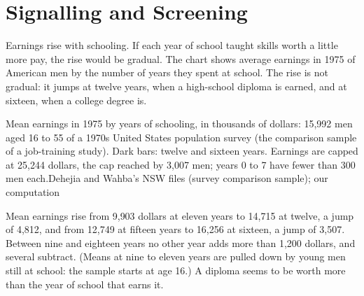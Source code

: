 \chapter{Signalling and Screening}\label{ch:b2:signalling-and-screening}

Earnings rise with schooling. If each year of school taught skills worth a little more pay, the rise would be gradual.
The chart shows average earnings in 1975 of American men by the number of years they spent at school. The rise is
not gradual: it jumps at twelve years, when a high-school diploma is earned, and at sixteen, when a college degree is.

\begin{openingchart}{Mean earnings in 1975 by years of schooling, in thousands of dollars: 15{,}992 men aged 16 to 55 of
  a 1970s United States population survey (the comparison sample of a job-training study). Dark bars: twelve and
  sixteen years. Earnings are capped at 25{,}244 dollars, the cap reached by 3{,}007 men; years 0 to 7 have fewer than
  300 men each.}{Dehejia and Wahba's NSW files (survey comparison sample); our computation}
\end{openingchart}

Mean earnings rise from 9{,}903 dollars at eleven years to 14{,}715 at twelve, a jump of 4{,}812, and from 12{,}749 at
fifteen years to 16{,}256 at sixteen, a jump of 3{,}507. Between nine and eighteen years no other year adds more than
1{,}200 dollars, and several subtract. (Means at nine to eleven years are pulled down by young men still at school: the
sample starts at age 16.) A diploma seems to be worth more than the year of school that earns it.

